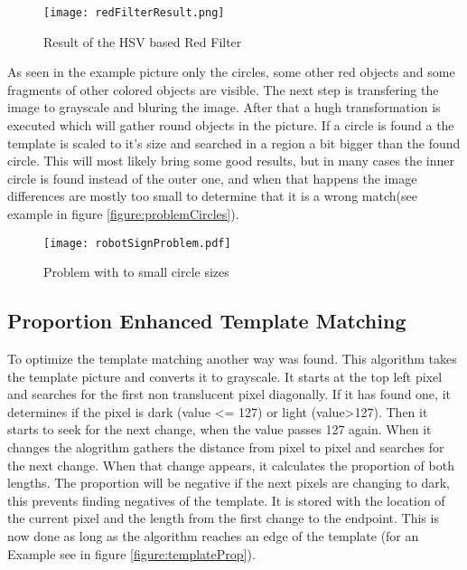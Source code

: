 \begin{figure}[H]
\begin{center}
  \texttt{[image: redFilterResult.png]}
  \caption{Result of the HSV based Red Filter}
  \label{figure:redFilter}
\end{center}
\end{figure}


As seen in the example picture only the circles, some other red objects and some fragments of
other colored objects are visible. The next step is transfering the image to grayscale and 
bluring the image. After that a hugh transformation is executed which will gather round
objects in the picture. If a circle is found a the template is scaled to it's size and 
searched in a region a bit bigger than the found circle.
\newpage
This will most likely bring some good results, but in many cases the inner circle is found
instead of the outer one, and when that happens the image differences are mostly too small
to determine that it is a wrong match(see example in figure \vref{figure:problemCircles}).

\begin{figure}[H]
\begin{center}
  \texttt{[image: robotSignProblem.pdf]}
  \caption{Problem with to small circle sizes}
  \label{figure:problemCircles}
\end{center}
\end{figure}

\subsection{Proportion Enhanced Template Matching}
To optimize the template matching another way was found. This algorithm
takes the template picture and converts it to grayscale. It starts at the top left pixel
and searches for the first non translucent pixel diagonally. If it has found one,
it determines if the pixel is dark (value <= 127) or light (value>127). Then it
starts to seek for the next change, when the value passes 127 again.
When it changes the alogrithm gathers the distance from pixel to pixel and searches for the next change.
When that change appears, it calculates the proportion of both lengths.
The proportion will be negative if the next pixels are changing to dark, 
this prevents finding negatives of the template.  
It is stored with the location of the current pixel and the
length from the first change to the endpoint. This is now done as long
as the algorithm reaches an edge of the template (for an Example see in figure \vref{figure:templateProp}).

